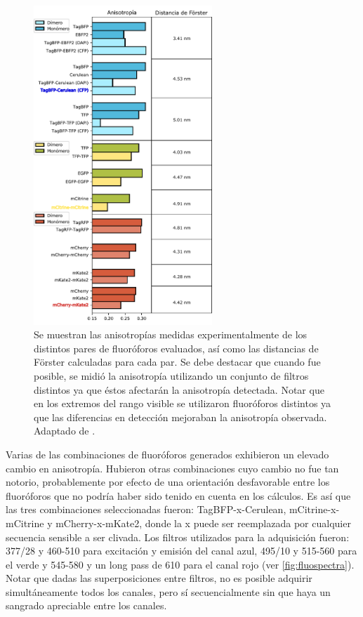 \begin{figure}[t!]
    \centering
    \includegraphics[width=0.6\textwidth]{img/cap_3/fluorophore_pairs.pdf}
    \caption{\footnotesize{Se muestran las anisotropías medidas experimentalmente de los distintos pares de fluoróforos evaluados, así como las distancias de Förster calculadas para cada par. Se debe destacar que cuando fue posible, se midió la anisotropía utilizando un conjunto de filtros distintos ya que éstos afectarán la anisotropía detectada. Notar que en los extremos del rango visible se utilizaron fluoróforos distintos ya que las diferencias en detección mejoraban la anisotropía observada. Adaptado de \cite{Corbat2018}.}}
    \label{fig:fluopairs}
\end{figure}

Varias de las combinaciones de fluoróforos generados exhibieron un elevado cambio en anisotropía. Hubieron otras combinaciones cuyo cambio no fue tan notorio, probablemente por efecto de una orientación desfavorable entre los fluoróforos que no podría haber sido tenido en cuenta en los cálculos. Es así que las tres combinaciones seleccionadas fueron: TagBFP-x-Cerulean, mCitrine-x-mCitrine y mCherry-x-mKate2, donde la x puede ser reemplazada por cualquier secuencia sensible a ser clivada. Los filtros utilizados para la adquisición fueron: 377/28 y 460-510 para excitación y emisión del canal azul, 495/10 y 515-560 para el verde y 545-580 y un long pass de 610 para el canal rojo (ver \cref{fig:fluospectra}). Notar que dadas las superposiciones entre filtros, no es posible adquirir simultáneamente todos los canales, pero sí secuencialmente sin que haya un sangrado apreciable entre los canales.

